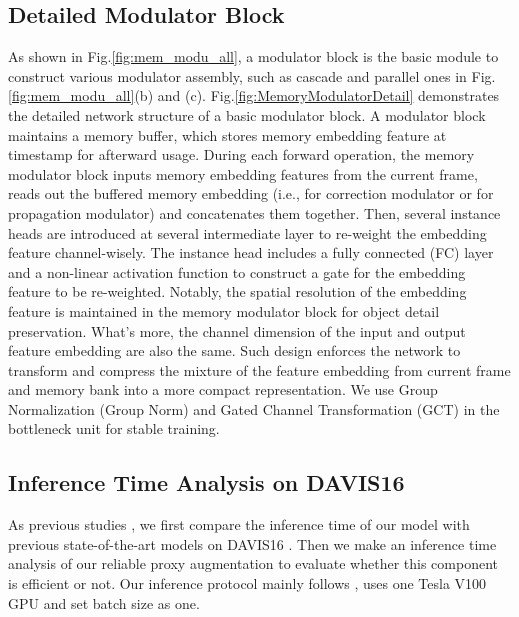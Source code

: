 \documentclass[letterpaper]{article} \usepackage{aaai22}  \usepackage{times}  \usepackage{helvet}  \usepackage{courier}  \usepackage[hyphens]{url}  \usepackage{graphicx} \urlstyle{rm} \def\UrlFont{\rm}  \usepackage{natbib}  \usepackage{caption} \DeclareCaptionStyle{ruled}{labelfont=normalfont,labelsep=colon,strut=off} \frenchspacing  \setlength{\pdfpagewidth}{8.5in}  \setlength{\pdfpageheight}{11in}  \usepackage{algorithm}
\begin{document}
\subsection{Detailed Modulator Block}
As shown in Fig.\ref{fig:mem_modu_all}, a modulator block is the basic module to construct various modulator assembly, such as cascade and parallel ones in Fig.\ref{fig:mem_modu_all}(b) and (c).
Fig.\ref{fig:MemoryModulatorDetail} demonstrates the detailed network structure of a basic modulator block. 
A modulator block maintains a memory buffer, which stores memory embedding feature  at timestamp  for afterward usage. During each forward operation, the memory modulator block inputs memory embedding features  from the current frame, reads out the buffered memory embedding (i.e.,  for correction modulator or  for propagation modulator) and concatenates them together.
Then, several instance heads are introduced at several intermediate layer to re-weight the embedding feature channel-wisely. The instance head includes a fully connected (FC) layer and a non-linear activation function to construct a gate for the embedding feature to be re-weighted. Notably, the spatial resolution of the embedding feature is maintained in the memory modulator block for object detail preservation. What's more, the channel dimension of the input and output feature embedding are also the same. Such design enforces the network to transform and compress the mixture of the feature embedding from current frame and memory bank into a more compact representation. We use Group Normalization (Group Norm) \cite{wu2018group} and Gated Channel Transformation (GCT) \cite{yang2020gated} in the bottleneck unit for stable training.


\subsection{Inference Time Analysis on DAVIS16}
As previous studies \cite{yang2020collaborative,oh2019video,xie2021efficient,oh2019video}, we first compare the inference time of our model with previous state-of-the-art models on DAVIS16 \cite{perazzi2016benchmark}. Then we make an inference time analysis of our reliable proxy augmentation to evaluate whether this component is efficient or not. Our inference protocol mainly follows \cite{yang2020collaborative}, uses one Tesla V100 GPU and set batch size as one. 
\end{document}
